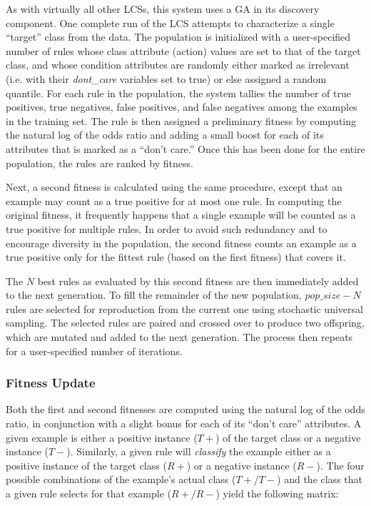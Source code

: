 \documentclass[12pt]{article}
\begin{document}
As with virtually all other LCSs, this system uses a GA in its discovery component. One complete run of the LCS attempts to characterize a single ``target'' class from the data. The population is initialized with a user-specified number of rules whose class attribute (action) values are set to that of the target class, and whose condition attributes are randomly either marked as irrelevant (i.e. with their \textit{dont\_care} variables set to true) or else assigned a random quantile. For each rule in the population, the system tallies the number of true positives, true negatives, false positives, and false negatives among the examples in the training set. The rule is then assigned a preliminary fitness by computing the natural log of the odds ratio and adding a small boost for each of its attributes that is marked as a ``don't care.'' Once this has been done for the entire population, the rules are ranked by fitness. 

Next, a second fitness is calculated using the same procedure, except that an example may count as a true positive for at most one rule. In computing the original fitness, it frequently happens that a single example will be counted as a true positive for multiple rules. In order to avoid such redundancy and to encourage diversity in the population, the second fitness counts an example as a true positive only for the fittest rule (based on the first fitness) that covers it. 

The $N$ best rules as evaluated by this second fitness are then immediately added to the next generation. To fill the remainder of the new population, $pop\_size - N$ rules are selected for reproduction from the current one using stochastic universal sampling. The selected rules are paired and crossed over to produce two offspring, which are mutated and added to the next generation. The process then repeats for a user-specified number of iterations.

\subsubsection{Fitness Update}

Both the first and second fitnesses are computed using the natural log of the odds ratio, in conjunction with a slight bonus for each of its ``don't care'' attributes. A given example is either a positive instance ($T+$) of the target class or a negative instance ($T-$). Similarly, a given rule will \emph{classify} the example either as a positive instance of the target class ($R+$) or a negative instance ($R-$). The four possible combinations of the example's actual class \mbox{($T+/T-$)} and the class that a given rule selects for that example ($R+/R-$) yield the following matrix:
\end{document}
